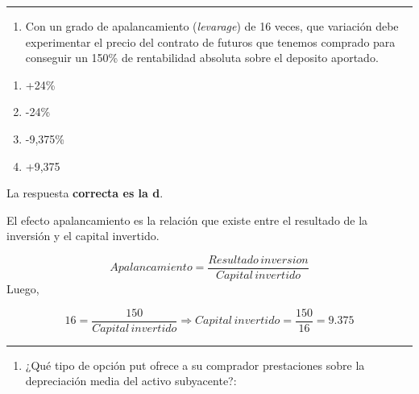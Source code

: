 \documentclass[
  letterpaper,
  DIV=11,
  numbers=noendperiod]{scrreprt}
\providecommand{\tightlist}{%
  \setlength{\itemsep}{0pt}\setlength{\parskip}{0pt}}\usepackage{longtable,booktabs,array}
\begin{document}
\begin{center}\rule{0.5\linewidth}{0.5pt}\end{center}

\begin{enumerate}
\def\labelenumi{\arabic{enumi}.}
\setcounter{enumi}{25}
\tightlist
\item
  Con un grado de apalancamiento (\emph{levarage}) de 16 veces, que
  variación debe experimentar el precio del contrato de futuros que
  tenemos comprado para conseguir un 150\% de rentabilidad absoluta
  sobre el deposito aportado.
\end{enumerate}

\begin{enumerate}
\def\labelenumi{\alph{enumi})}
\item
  +24\%
\item
  -24\%
\item
  -9,375\%
\item
  +9,375
\end{enumerate}

\begin{tcolorbox}[enhanced jigsaw, left=2mm, opacityback=0, colback=white, breakable, arc=.35mm, bottomrule=.15mm, rightrule=.15mm, toprule=.15mm, leftrule=.75mm, colframe=quarto-callout-tip-color-frame]
\begin{minipage}[t]{5.5mm}
\textcolor{quarto-callout-tip-color}{\faLightbulb}
\end{minipage}%
\begin{minipage}[t]{\textwidth - 5.5mm}

La respuesta \textbf{correcta es la d}.

El efecto apalancamiento es la relación que existe entre el resultado de
la inversión y el capital invertido.

\[Apalancamiento= \frac {Resultado\,inversion } {Capital\,invertido}\]
Luego,

\[16=\frac{150}{Capital\,invertido} \Rightarrow Capital\,invertido=\frac{150}{16} =9.375\]

\end{minipage}%
\end{tcolorbox}

\begin{center}\rule{0.5\linewidth}{0.5pt}\end{center}

\begin{enumerate}
\def\labelenumi{\arabic{enumi}.}
\setcounter{enumi}{26}
\tightlist
\item
  ¿Qué tipo de opción put ofrece a su comprador prestaciones sobre la
  depreciación media del activo subyacente?:
\end{enumerate}
\end{document}
